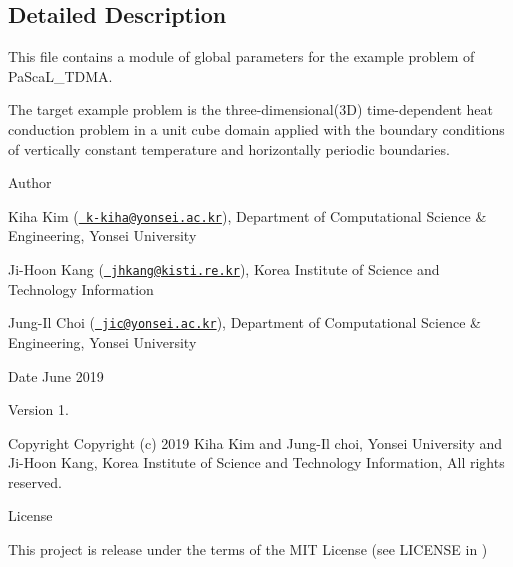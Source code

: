 \subsection{Detailed Description}
This file contains a module of global parameters for the example problem of Pa\+Sca\+L\+\_\+\+T\+D\+MA. 

The target example problem is the three-\/dimensional(3D) time-\/dependent heat conduction problem in a unit cube domain applied with the boundary conditions of vertically constant temperature and horizontally periodic boundaries. \begin{DoxyAuthor}{Author}

\end{DoxyAuthor}

\begin{DoxyItemize}
\item Kiha Kim (\href{mailto:k-kiha@yonsei.ac.kr}{\texttt{ k-\/kiha@yonsei.\+ac.\+kr}}), Department of Computational Science \& Engineering, Yonsei University
\item Ji-\/\+Hoon Kang (\href{mailto:jhkang@kisti.re.kr}{\texttt{ jhkang@kisti.\+re.\+kr}}), Korea Institute of Science and Technology Information
\item Jung-\/\+Il Choi (\href{mailto:jic@yonsei.ac.kr}{\texttt{ jic@yonsei.\+ac.\+kr}}), Department of Computational Science \& Engineering, Yonsei University
\end{DoxyItemize}

\begin{DoxyDate}{Date}
June 2019 
\end{DoxyDate}
\begin{DoxyVersion}{Version}
1. 
\end{DoxyVersion}
\begin{DoxyParagraph}{Copyright}
Copyright (c) 2019 Kiha Kim and Jung-\/\+Il choi, Yonsei University and Ji-\/\+Hoon Kang, Korea Institute of Science and Technology Information, All rights reserved. 
\end{DoxyParagraph}
\begin{DoxyParagraph}{License }

\end{DoxyParagraph}
This project is release under the terms of the M\+IT License (see L\+I\+C\+E\+N\+SE in ) 